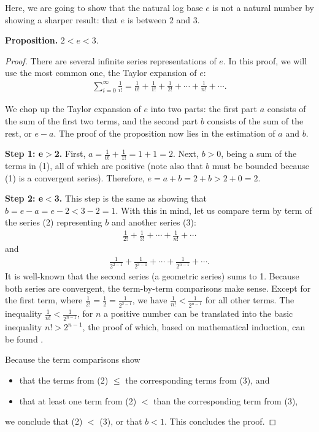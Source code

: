 \documentclass[12pt]{article}
\begin{document}
Here, we are going to show that the natural log base $e$ is not a natural number by showing a sharper result: that $e$ is between $2$ and $3$.

\textbf{Proposition.} $2<e<3$.
\begin{proof}  There are several infinite series representations of $e$.  In this proof, we will use the most common one, the Taylor expansion of $e$:
\begin{eqnarray}
\sum_{i=0}^{\infty}\frac{1}{i!}=\frac{1}{0!}+\frac{1}{1!}+\frac{1}{2!}+\cdots+\frac{1}{n!}+\cdots.
\end{eqnarray}

We chop up the Taylor expansion of $e$ into two parts: the first part $a$ consists of the sum of the first two terms, and the second part $b$ consists of the sum of the rest, or $e-a$.  The proof of the proposition now lies in the estimation of $a$ and $b$.

\textbf{Step 1: e$>$2.}  First, $a=\frac{1}{0!}+\frac{1}{1!}=1+1=2$.  Next, $b>0$, being a sum of the terms in (1), all of which are positive (note also that $b$ must be bounded because (1) is a convergent series).  Therefore, $e=a+b=2+b>2+0=2$.

\textbf{Step 2: e$<$3.}  This step is the same as showing that $b=e-a=e-2<3-2=1$.  With this in mind, let us compare term by term of the series (2) representing $b$ and another series (3):
\begin{eqnarray}
\frac{1}{2!}+\frac{1}{3!}+\cdots+\frac{1}{n!}+\cdots
\end{eqnarray}
and 
\begin{eqnarray}
\frac{1}{2^{2-1}}+\frac{1}{2^{3-1}}+\cdots+\frac{1}{2^{n-1}}+\cdots.
\end{eqnarray}
It is well-known that the second series (a geometric series) sums to 1.  Because both series are convergent, the term-by-term comparisons make sense.  Except for the first term, where $\frac{1}{2!}=\frac{1}{2}=\frac{1}{2^{2-1}}$, we have $\frac{1}{n!}<\frac{1}{2^{n-1}}$ for all other terms.  The inequality $\frac{1}{n!}<\frac{1}{2^{n-1}}$, for $n$ a positive number can be translated into the basic inequality $n!>2^{n-1}$, the proof of which, based on mathematical induction, can be found .  

Because the term comparisons show 
\begin{itemize}
\item that the terms from (2) $\le$ the corresponding terms from (3), and 
\item that at least one term from (2) $<$ than the corresponding term from (3),
\end{itemize}
we conclude that (2) $<$ (3), or that $b<1$.  This concludes the proof.
\end{proof}
\end{document}
